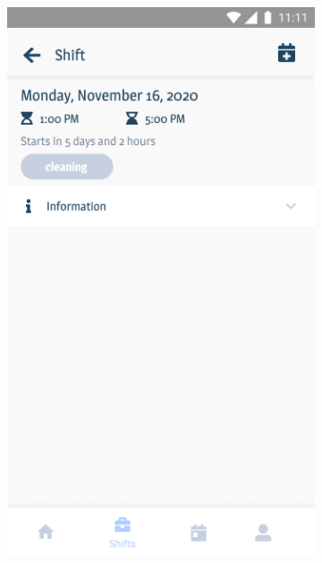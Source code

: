 \documentclass[twoside]{ctuthesis}
\begin{document}
\begin{figure}[h]
	\centering
	\begin{subfigure}{.5\textwidth}
		\centering
		\includegraphics[width=.9\linewidth]{img/v1-shift-detail.png}
		\label{fig:v1-shift}
	\end{subfigure}%
	\begin{subfigure}[h!]{.5\textwidth}
		\centering

\end{subfigure}
\end{figure}
\end{document}
